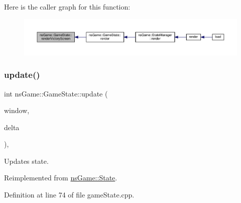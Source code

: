 Here is the caller graph for this function\+:\nopagebreak
\begin{figure}[H]
\begin{center}
\leavevmode
\includegraphics[width=350pt]{classns_game_1_1_game_state_a66f328c56ed9887e02a93db856316d4c_icgraph}
\end{center}
\end{figure}
\mbox{\label{classns_game_1_1_game_state_a4d3cb871a1aec541a37fe241664b738c}} 
\subsubsection{\texorpdfstring{update()}{update()}}
{\footnotesize\ttfamily int ns\+Game\+::\+Game\+State\+::update (\begin{DoxyParamCaption}\item[{Min\+GL \&}]{window,  }\item[{unsigned}]{delta }\end{DoxyParamCaption})\hspace{0.3cm}{\ttfamily [override]}, {\ttfamily [virtual]}}



Updates state. 



Reimplemented from \hyperlink{structns_game_1_1_state_ae809e89ac9df4a43ab90d5d5932e2bc7}{ns\+Game\+::\+State}.



Definition at line 74 of file game\+State.\+cpp.

